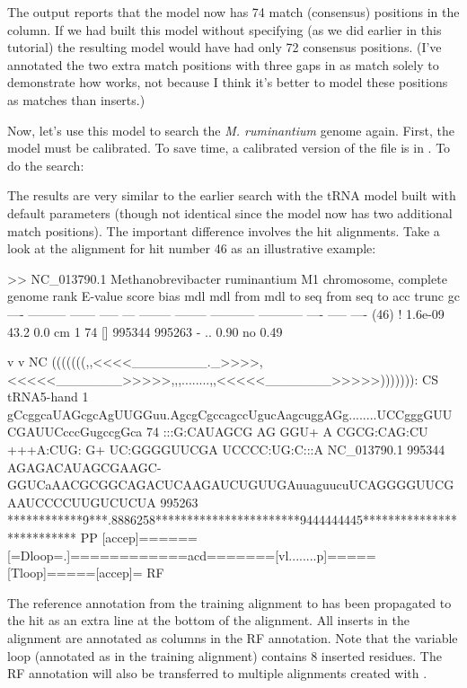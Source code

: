 The output reports that the model now has 74 match (consensus)
positions in the  column. If we had built this model
without specifying  (as we did earlier in this tutorial)
the resulting model would have had only 72 consensus positions.
(I've annotated the two extra match positions with three gaps in
 as match solely to demonstrate how
 works, not because I think it's better to model these
positions as matches than inserts.)

Now, let's use this model to search the \emph{M. ruminantium} genome
again. First, the model must be calibrated. To save time, a calibrated
version of the file is in . To do the
search:


The results are very similar to the earlier search with the
tRNA model built with default  parameters (though not
identical since the model now has two additional match positions). The
important difference involves the hit alignments. Take a look at the
alignment for hit number 46 as an illustrative example:

\begin{widesreoutput}
>> NC_013790.1  Methanobrevibacter ruminantium M1 chromosome, complete genome
 rank     E-value  score  bias mdl mdl from   mdl to       seq from      seq to       acc trunc   gc
 ----   --------- ------ ----- --- -------- --------    ----------- -----------      ---- ----- ----
 (46) !   1.6e-09   43.2   0.0  cm        1       74 []      995344      995263 - .. 0.90    no 0.49

                                 v          v                                                            NC
                     (((((((,,<<<<________._>>>>,<<<<<_______>>>>>,,,........,,<<<<<_______>>>>>))))))): CS
   tRNA5-hand      1 gCcggcaUAGcgcAgUUGGuu.AgcgCgccagccUgucAagcuggAGg........UCCgggGUUCGAUUCcccGugccgGca 74    
                     :::G:CAUAGCG AG  GGU+ A CGCG:CAG:CU +++A:CUG: G+        UC:GGGGUUCGA UCCCC:UG:C:::A
  NC_013790.1 995344 AGAGACAUAGCGAAGC-GGUCaAACGCGGCAGACUCAAGAUCUGUUGAuuaguucuUCAGGGGUUCGAAUCCCCUUGUCUCUA 995263
                     ************9***.8886258***********************9444444445************************** PP
                     [accep]======[=Dloop=.]============acd=======[vl........p]=====[Tloop]=====[accep]= RF
\end{widesreoutput}

The reference annotation from the training alignment to 
has been propagated to the hit as an extra  line at the
bottom of the alignment. All inserts in the alignment are annotated as
 columns in the RF annotation. Note that the variable loop
(annotated as \otext{[vlp]} in the training alignment) contains 8
inserted residues. The RF annotation will also be transferred to
multiple alignments created with .
